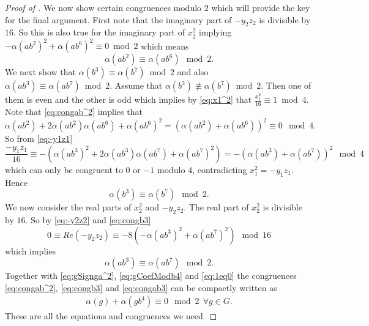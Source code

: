\documentclass[a4paper,10pt]{amsart}
\theoremstyle{definition}
\theoremstyle{remark}
\begin{document}
\begin{proof}[Proof of ]
We now show certain congruences modulo $2$ which will provide the key for the final argument.
First note that the imaginary part of $-y_2z_2$ is divisible by $16$. So this is also true for the imaginary part of $x_2^2$ implying $-\alpha(ab^2)^2 + \alpha(ab^6)^2 \equiv 0 \bmod 2$ which means
\begin{equation}\label{eq:congab^2}
\alpha(ab^2) \equiv \alpha(ab^6) \mod 2.
\end{equation}
We next show that $\alpha(b^3) \equiv \alpha(b^7) \bmod 2$ and also $\alpha(ab^3) \equiv \alpha(ab^7) \bmod 2$. Assume that $\alpha(b^3) \not\equiv \alpha(b^7) \bmod 2$. Then one of them is even and the other is odd which implies by \eqref{eq:x1^2} that $\frac{x_1^2}{16} \equiv 1 \bmod 4$. Note that \eqref{eq:congab^2} implies that 
\[\alpha(ab^2) + 2\alpha(ab^2)\alpha(ab^6) + \alpha(ab^6)^2 = (\alpha(ab^2) + \alpha(ab^6))^2 \equiv 0 \mod 4. \]
So from \eqref{eq:-y1z1}
\[\frac{-y_1z_1}{16} \equiv -(\alpha(ab^3)^2 + 2\alpha(ab^3)\alpha(ab^7) + \alpha(ab^7)^2) = -(\alpha(ab^3) + \alpha(ab^7))^2 \mod 4 \]
which can only be congruent to $0$ or $-1$ modulo $4$, contradicting $x_1^2 = -y_1z_1$. Hence
\begin{equation}\label{eq:congb3}
\alpha(b^3) \equiv \alpha(b^7) \mod 2.
\end{equation}
We now consider the real parts of $x_2^2$ and $-y_2z_2$. The real part of $x_2^2$ is divisible by $16$. 
So by \eqref{eq:-y2z2} and \eqref{eq:congb3}
\[0 \equiv Re(-y_2z_2) \equiv -8(-\alpha(ab^3)^2 + \alpha(ab^7)^2) \mod 16\]
which implies
\begin{equation}\label{eq:congab3}
\alpha(ab^3) \equiv \alpha(ab^7) \mod 2.
\end{equation}
Together with \eqref{eq:gSignga^2}, \eqref{eq:gCoefModb4} and \eqref{eq:1eq0} the congruences \eqref{eq:congab^2}, \eqref{eq:congb3} and \eqref{eq:congab3} can be compactly written as 
\begin{align}\label{eq:congbplusgb4}
\alpha(g) + \alpha(gb^4) \equiv 0 \mod 2 \ \ \forall g \in G.
\end{align}
These are all the equations and congruences we need.


\end{proof}
\end{document}
